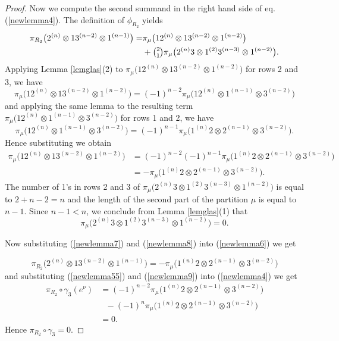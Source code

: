 \documentclass[11pt]{amsart}
\theoremstyle{definition}
\numberwithin{equation}{section}
\begin{document}
\begin{proof}
Now we compute the second summand in the right hand side of eq. (\ref{newlemma4}). The definition of $\phi_{R_2}$ yields 
\begin{align}\label{newlemma6}
	\pi_{R_2}\big(2^{(n)} \otimes 13^{(n-2)} \otimes 1^{(n-1)}\big)= &\pi_{\mu}\big(12^{(n)} \otimes 13^{(n-2)} \otimes 1^{(n-2)}\big) \\\nonumber&+\tbinom{2}{1}\pi_{\mu}\big(2^{(n)}3 \otimes 1^{(2)}3^{(n-3)} \otimes 1^{(n-2)}\big).
\end{align}
Applying Lemma \ref{lemglas}(2) to $\pi_{\mu}\big(12^{(n)} \otimes 13^{(n-2)} \otimes 1^{(n-2)}\big)$ for rows 2 and 3, we have \[ \pi_{\mu}\big(12^{(n)} \otimes 13^{(n-2)} \otimes 1^{(n-2)}\big)=(-1)^{n-2}  \pi_{\mu}\big(12^{(n)} \otimes 1^{(n-1)} \otimes 3^{(n-2)}\big)\] 
and applying the same lemma to the resulting term $\pi_{\mu}\big(12^{(n)} \otimes 1^{(n-1)} \otimes 3^{(n-2)}\big)$ for rows 1 and 2, we have \[ \pi_{\mu}\big(12^{(n)} \otimes 1^{(n-1)} \otimes 3^{(n-2)}\big) =(-1)^{n-1}\pi_{\mu}\big(1^{(n)}2 \otimes 2^{(n-1)} \otimes 3^{(n-2)}\big).\] Hence substituting we obtain \begin{align}\label{newlemma7}
\pi_{\mu}\big(12^{(n)} \otimes 13^{(n-2)} \otimes 1^{(n-2)}\big)&=(-1)^{n-2}(-1)^{n-1}\pi_{\mu}\big(1^{(n)}2 \otimes 2^{(n-1)} \otimes 3^{(n-2)}\big)\\\nonumber&= - \pi_{\mu}\big(1^{(n)}2 \otimes 2^{(n-1)} \otimes 3^{(n-2)}\big).
\end{align}
The number of 1's in rows 2 and 3 of $\pi_\mu\big(2^{(n)}3 \otimes 1^{(2)}3^{(n-3)} \otimes 1^{(n-2)}\big)$ is equal to $2+n-2=n$ and the length of the second part of the partition $\mu$ is equal to $n-1$. Since $n-1 < n$, we conclude from Lemma \ref{lemglas}(1) that \begin{equation}\label{newlemma8}\pi_\mu\big(2^{(n)}3 \otimes 1^{(2)}3^{(n-3)} \otimes 1^{(n-2)}\big)=0.\end{equation}

Now substituting (\ref{newlemma7}) and (\ref{newlemma8}) into (\ref{newlemma6}) we get 

\begin{equation}\label{newlemma9}
	\pi_{R_2}\big(2^{(n)} \otimes 13^{(n-2)} \otimes 1^{(n-1)}\big)= -\pi_{\mu}\big(1^{(n)}2 \otimes 2^{(n-1)} \otimes 3^{(n-2)}\big)
\end{equation}
and substituting (\ref{newlemma55}) and (\ref{newlemma9}) into (\ref{newlemma4}) we get
\begin{align*}\pi_{R_2} \circ \gamma_3 (e^\nu)&=(-1)^{n-2}\pi_{\mu}\big(1^{(n)}2 \otimes 2^{(n-1)} \otimes 3^{(n-2)}\big) \\& \ \ \ -(-1)^n \pi_{\mu}\big(1^{(n)}2 \otimes 2^{(n-1)} \otimes 3^{(n-2)}\big)\\& =0.\end{align*}
Hence $\pi_{R_2} \circ \gamma_3=0.$
\end{proof}
\end{document}

